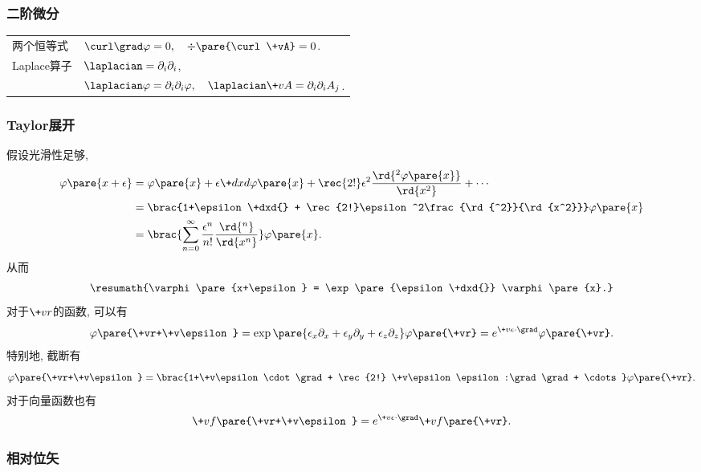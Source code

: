 \documentclass[hidelinks]{ctexart}
\begin{document}


\subsubsection{二阶微分} %
\label{ssub:二阶微分}

\begin{tabular}{ll}
两个恒等式 & $\displaystyle \curl\grad\varphi = 0,\quad \div\pare{\curl\+vA} = 0$. \\
Laplace算子 & $\displaystyle \laplacian = \partial_i\partial_i$, \\
& $\displaystyle \laplacian \varphi = \partial_i \partial_i \varphi,\quad \laplacian \+vA = \partial_i \partial_i A_j$. \\
\end{tabular}


\subsubsection{Taylor展开} %
\label{ssub:taylor展开}

假设光滑性足够,
\begin{align*}
    \varphi\pare{x+\epsilon} &= \varphi\pare{x} + \epsilon \+dxd{\varphi\pare{x}} + \rec{2!}\epsilon^2 \frac{\rd{^2\varphi\pare{x}}}{\rd{x^2}} + \cdots  \\
    &= \brac{1+\epsilon \+dxd{} + \rec{2!}\epsilon^2\frac{\rd{^2}}{\rd{x^2}}}\varphi\pare{x} \\
    &= \brac{\sum_{n=0}^\infty \frac{\epsilon^n}{n!} \frac{\rd{^n}}{\rd{x^n}}}\varphi\pare{x}.
\end{align*}
从而
\[ \resumath{\varphi\pare{x+\epsilon} = \exp\pare{\epsilon \+dxd{}} \varphi\pare{x}.} \]
对于$\+vr$的函数, 可以有
\[ \varphi\pare{\+vr+\+v\epsilon} = \exp\pare{\epsilon_x \partial_x + \epsilon_y \partial_y + \epsilon_z \partial_z}\varphi\pare{\+vr} = e^{\+v\epsilon\cdot\grad}\varphi\pare{\+vr}. \]
特别地, 截断有
\[ \varphi\pare{\+vr+\+v\epsilon} = \brac{1+\+v\epsilon\cdot\grad + \rec{2!} \+v\epsilon\epsilon:\grad\grad + \cdots }\varphi\pare{\+vr}. \]
对于向量函数也有
\[ \+vf\pare{\+vr+\+v\epsilon} = e^{\+v\epsilon\cdot\grad}\+vf\pare{\+vr}. \]


\subsubsection{相对位矢} %
\label{ssub:相对位矢}
\end{document}
